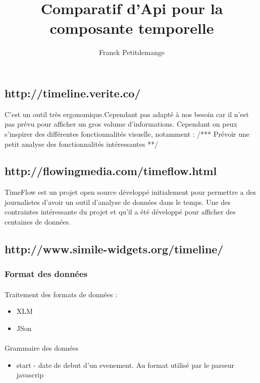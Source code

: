 \documentclass[10pt,a4paper]{article}
\author{Franck Petitdemange}
\title{Comparatif d'Api pour la composante temporelle}
\begin{document}
\subsection*{http://timeline.verite.co/}
C'est un outil très ergonomique.Cependant pas adapté à nos besoin car il n'est pas prévu pour afficher un gros volume d'informations. Cependant on peux s'inspirer des différentes fonctionnalités visuelle, notamment : 
/*** Prévoir une petit analyse des fonctionnalités intéressantes **/

\subsection*{http://flowingmedia.com/timeflow.html}
TimeFlow est un projet open source développé initialement pour permettre a des journalistes d'avoir un outil d'analyse de données dans le temps. Une des contraintes intéressante du projet et qu'il a été développé pour afficher des centaines de données.

\subsection{http://www.simile-widgets.org/timeline/}
\subsubsection{Format des données}
\paragraph{}Traitement des formats de données : 
\begin{itemize}
	\item XLM
	\item JSon
\end{itemize}

\paragraph{}Grammaire des données 
\begin{itemize}
\item start - date de debut d'un evenement. Au format utilisé par le parseur javascrip
\end{itemize}
\end{document}
